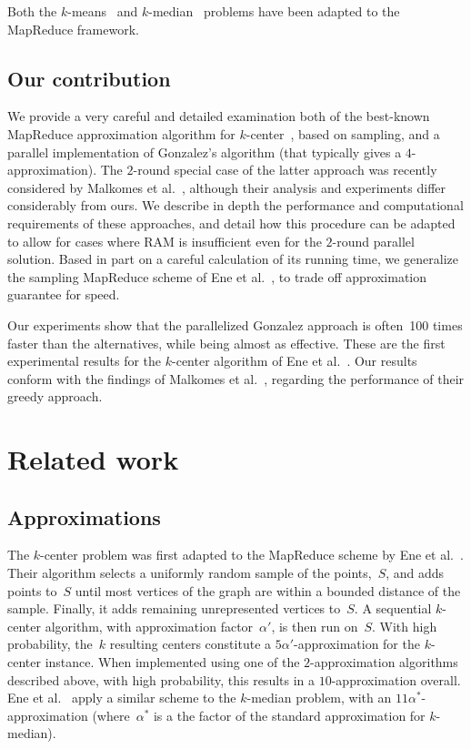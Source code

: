 \documentclass[11pt]{article}
\begin{document}
Both the $k$-means~\cite{bahmani2012scalable} and $k$-median~\cite{ene2011fast} problems have been adapted to the MapReduce framework.


\subsection{Our contribution}
We provide a very careful and detailed examination both of the best-known
MapReduce approximation algorithm for $k$-center~\cite{ene2011fast}, based on
sampling,
and a parallel implementation of Gonzalez's algorithm (that typically gives a
$4$-approximation).
The $2$-round special case of the latter approach was recently considered by Malkomes et
al.~\cite{malkomes2015fast}, although their analysis and experiments differ
considerably from ours.
We describe in depth the performance and computational requirements of these
approaches, and detail how this procedure can be adapted to allow for cases where RAM is insufficient even for the $2$-round parallel solution.
Based in part on a careful calculation of its running time,
we generalize the sampling MapReduce scheme of Ene et al.~\cite{ene2011fast},
to trade off approximation guarantee for speed.

Our experiments show that the parallelized Gonzalez approach is often~100 times faster than the alternatives, while being almost as effective.
These are the first experimental results for the $k$-center algorithm of Ene et al.~\cite{ene2011fast}.
Our results conform with the findings of Malkomes et
al.~\cite{malkomes2015fast}, regarding the performance of their greedy approach.


\section{Related work}

\subsection{Approximations}
The $k$-center problem was first adapted to the MapReduce scheme
by Ene et al.~\cite{ene2011fast}.
Their algorithm selects a uniformly random sample of the points,~$S$, and
adds points to~$S$ until most vertices of the graph are
within a bounded distance of the sample.
Finally, it adds remaining unrepresented vertices to~$S$. 
A sequential $k$-center algorithm, with approximation factor~$\alpha'$,
is then run on~$S$.
With high probability,
the~$k$ resulting centers constitute
a $5\alpha'$-approximation for the $k$-center instance.
When implemented using one of the $2$-approximation algorithms described
above, with high probability, this results in a $10$-approximation overall. 
Ene et al.~\cite{ene2011fast} apply a similar scheme to the $k$-median
problem, with an $11\alpha^*$-approximation (where~$\alpha^*$ is a the factor
of the standard approximation for $k$-median).
\end{document}
